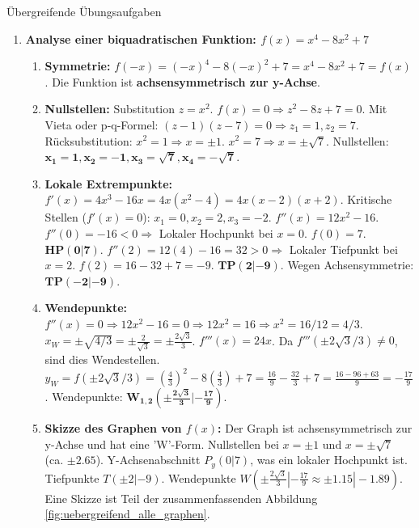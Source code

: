 \begin{loesungsumgebung}{Übergreifende Übungsaufgaben}
\begin{enumerate}
    \item \textbf{Analyse einer biquadratischen Funktion: $f(x) = x^4 - 8x^2 + 7$}
    \begin{enumerate}[label=(\alph*)]
        \item \textbf{Symmetrie:} $f(-x) = (-x)^4 - 8(-x)^2 + 7 = x^4 - 8x^2 + 7 = f(x)$.
        Die Funktion ist \textbf{achsensymmetrisch zur y-Achse}.
        \item \textbf{Nullstellen:} Substitution $z=x^2$. $f(x)=0 \Rightarrow z^2 - 8z + 7 = 0$.
        Mit Vieta oder p-q-Formel: $(z-1)(z-7)=0 \Rightarrow z_1=1, z_2=7$.
        Rücksubstitution: $x^2=1 \Rightarrow x=\pm 1$. $x^2=7 \Rightarrow x=\pm\sqrt{7}$.
        Nullstellen: $\mathbf{x_1=1, x_2=-1, x_3=\sqrt{7}, x_4=-\sqrt{7}}$.
        \item \textbf{Lokale Extrempunkte:}
        $f'(x) = 4x^3 - 16x = 4x(x^2-4) = 4x(x-2)(x+2)$.
        Kritische Stellen ($f'(x)=0$): $x_1=0, x_2=2, x_3=-2$.
        $f''(x) = 12x^2 - 16$.
        $f''(0) = -16 < 0 \Rightarrow$ Lokaler Hochpunkt bei $x=0$. $f(0)=7$. $\mathbf{HP(0|7)}$.
        $f''(2) = 12(4)-16 = 32 > 0 \Rightarrow$ Lokaler Tiefpunkt bei $x=2$. $f(2)=16-32+7=-9$. $\mathbf{TP(2|-9)}$.
        Wegen Achsensymmetrie: $\mathbf{TP(-2|-9)}$.
        \item \textbf{Wendepunkte:}
        $f''(x)=0 \Rightarrow 12x^2 - 16 = 0 \Rightarrow 12x^2=16 \Rightarrow x^2 = 16/12 = 4/3$.
        $x_W = \pm\sqrt{4/3} = \pm \frac{2}{\sqrt{3}} = \pm \frac{2\sqrt{3}}{3}$.
        $f'''(x) = 24x$. Da $f'''(\pm 2\sqrt{3}/3) \neq 0$, sind dies Wendestellen.
        $y_W = f(\pm 2\sqrt{3}/3) = (\frac{4}{3})^2 - 8(\frac{4}{3}) + 7 = \frac{16}{9} - \frac{32}{3} + 7 = \frac{16 - 96 + 63}{9} = -\frac{17}{9}$.
        Wendepunkte: $\mathbf{W_{1,2}(\pm \frac{2\sqrt{3}}{3} | -\frac{17}{9})}$.
        \item \textbf{Skizze des Graphen von $f(x)$:}
        Der Graph ist achsensymmetrisch zur y-Achse und hat eine 'W'-Form. Nullstellen bei $x=\pm 1$ und $x=\pm\sqrt{7}$ (ca. $\pm 2.65$). Y-Achsenabschnitt $P_y(0|7)$, was ein lokaler Hochpunkt ist. Tiefpunkte $T(\pm 2|-9)$. Wendepunkte $W(\pm \frac{2\sqrt{3}}{3}|-\frac{17}{9} \approx \pm 1.15|-1.89)$. Eine Skizze ist Teil der zusammenfassenden Abbildung \ref{fig:uebergreifend_alle_graphen}.
    \end{enumerate}


\end{enumerate}
\end{loesungsumgebung}
